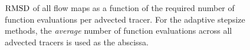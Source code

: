 \begin{figure}[htpb]
    \centering
    
    \caption[$\rmsd$ of all flow maps as a function of the required number of
    function evaluations per advected tracer]{$\rmsd$ of all flow maps as a function of the required number of
    function evaluations per advected tracer. For the adaptive stepsize methods, the \emph{average}
    number of function evaluations across all advected tracers is used as the
    abscissa.}
    \label{fig:flowmap_err_both}
\end{figure}

